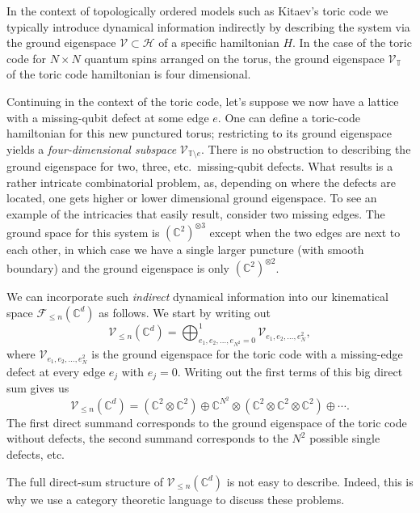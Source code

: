 In the context of topologically ordered models such as Kitaev's toric code we typically introduce dynamical information indirectly by describing the system via the ground eigenspace $\mathcal{V}\subset \mathcal{H}$ of a specific hamiltonian $H$. In the case of the toric code for $N\times N$ quantum spins arranged on the torus, the ground eigenspace $\mathcal{V}_{\mathbb{T}}$ of the toric code hamiltonian is four dimensional.

Continuing in the context of the toric code, let's suppose we now have a lattice with a missing-qubit defect at some edge $e$. One can define a toric-code hamiltonian for this new punctured torus; restricting to its ground eigenspace yields a \emph{four-dimensional subspace} $\mathcal{V}_{\mathbb{T}\setminus e}$. There is no obstruction to describing the ground eigenspace for two, three, etc.\ missing-qubit defects. What results is a rather intricate combinatorial problem, as, depending on where the defects are located, one gets higher or lower dimensional ground eigenspace. To see an example of the intricacies that easily result, consider two missing edges. The ground space for this system is $(\mathbb{C}^2)^{\otimes 3}$ except when the two edges are next to each other, in which case we have a single larger puncture (with smooth boundary) and the ground eigenspace is only $(\mathbb{C}^2)^{\otimes 2}$.

We can incorporate such \emph{indirect} dynamical information into our kinematical space $\mathcal{F}_{\le n}(\mathbb{C}^d)$ as follows. We start by writing out 
\begin{equation}
	\mathcal{V}_{\le n}(\mathbb{C}^d) = \bigoplus_{e_1,e_2, \ldots, e_{N^2} =0}^1 \mathcal{V}_{e_1,e_2,\ldots, e_N^2},
\end{equation}
where $\mathcal{V}_{e_1,e_2,\ldots, e_N^2}$ is the ground eigenspace for the toric code with a missing-edge defect at every edge $e_j$ with $e_j=0$. Writing out the first terms of this big direct sum gives us
\begin{equation}
	\mathcal{V}_{\le n}(\mathbb{C}^d) = (\mathbb{C}^2\otimes \mathbb{C}^2)\oplus \mathbb{C}^{N^2}\otimes (\mathbb{C}^2\otimes \mathbb{C}^2\otimes \mathbb{C}^2)\oplus \cdots.
\end{equation}
The first direct summand corresponds to the ground eigenspace of the toric code without defects, the second summand corresponds to the $N^2$ possible single defects, etc.

The full direct-sum structure of $\mathcal{V}_{\le n}(\mathbb{C}^d)$ is not easy to describe. Indeed, this is why we use a category theoretic language to discuss these problems. 


